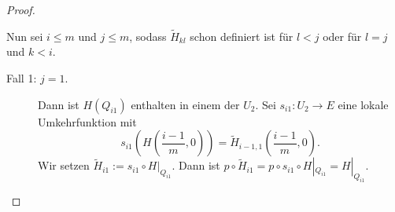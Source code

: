 \documentclass[language=ngerman]{TemplateLecture} %
\begin{document}
\begin{proof}
\begin{enumerate}[$(i)$:]
\begin{description}
            Nun sei $i \leq m$ und $j \leq m$, sodass $\tilde{H}_{kl}$ schon definiert ist für $l < j$ oder für $l = j$ und $k < i$.
            \begin{description}
                \item[Fall 1: $j = 1$.] Dann ist $H(Q_{i1})$ enthalten in einem der $U_2$. Sei $s_{i1}: U_2 \to E$ eine lokale Umkehrfunktion mit 
                \begin{equation*}
                    s_{i1}\left(H\left(\frac{i-1}{m}, 0\right)\right) = \tilde{H}_{i-1, 1}\left(\frac{i-1}{m}, 0\right).
                \end{equation*}
                Wir setzen $\tilde{H}_{i1} := s_{i1} \circ H|_{Q_{i1}}$. Dann ist $p \circ \tilde{H}_{i1} = p \circ s_{i1} \circ H|_{Q_{i1}} = H|_{Q_{i1}}$.
                

\end{description}
\end{description}
\end{enumerate}
\end{proof}
\end{document}
